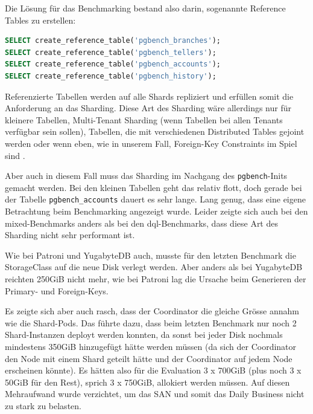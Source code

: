 \begin{flushleft}
    Die Lösung für das Benchmarking bestand also darin, sogenannte Reference Tables zu erstellen:
\lstset{style=gra_codestyle}
\begin{lstlisting}[language=sql, caption=Citus - Benchmarking - Reference Table Sharding,captionpos=b,label={lst:benchmarking_reference_table_sharding},breaklines=true]
SELECT create_reference_table('pgbench_branches');
SELECT create_reference_table('pgbench_tellers');
SELECT create_reference_table('pgbench_accounts');
SELECT create_reference_table('pgbench_history');
\end{lstlisting}
    Referenzierte Tabellen werden auf alle Shards repliziert und erfüllen somit die Anforderung an das Sharding.
    Diese Art des Sharding wäre allerdings nur für kleinere Tabellen, Multi-Tenant Sharding (wenn Tabellen bei allen Tenants verfügbar sein sollen),
    Tabellen, die mit verschiedenen Distributed Tables gejoint werden oder wenn eben, wie in unserem Fall, Foreign-Key Constraints im Spiel sind \cite{KPPLMKD4}.
\end{flushleft}
\begin{flushleft}
    Aber auch in diesem Fall muss das Sharding im Nachgang des \texttt{pgbench}-Inits gemacht werden.
    Bei den kleinen Tabellen geht das relativ flott, doch gerade bei der Tabelle \texttt{pgbench\_accounts} dauert es sehr lange.
    Lang genug, dass eine eigene Betrachtung beim Benchmarking angezeigt wurde.
    Leider zeigte sich auch bei den mixed-Benchmarks anders als bei den dql-Benchmarks, dass diese Art des Sharding nicht sehr performant ist.
\end{flushleft}
\begin{flushleft}
    Wie bei Patroni und YugabyteDB auch, musste für den letzten Benchmark die StorageClass auf die neue Disk verlegt werden.
    Aber anders als bei YugabyteDB reichten 250GiB nicht mehr, wie bei Patroni lag die Ursache beim Generieren der Primary- und Foreign-Keys.
\end{flushleft}
\begin{flushleft}
    Es zeigte sich aber auch rasch, dass der Coordinator die gleiche Grösse annahm wie die Shard-Pods.
    Das führte dazu, dass beim letzten Benchmark nur noch 2 Shard-Instanzen deployt werden konnten,
    da sonst bei jeder Disk nochmals mindestens 350GiB hinzugefügt hätte werden müssen (da sich der Coordinator den Node mit einem Shard geteilt hätte und der Coordinator auf jedem Node erscheinen könnte).
    Es hätten also für die Evaluation 3 x 700GiB (plus noch 3 x 50GiB für den Rest), sprich 3 x 750GiB, allokiert werden müssen.
    Auf diesen Mehraufwand wurde verzichtet, um das \Gls{SAN} und somit das Daily Business nicht zu stark zu belasten.
\end{flushleft}
